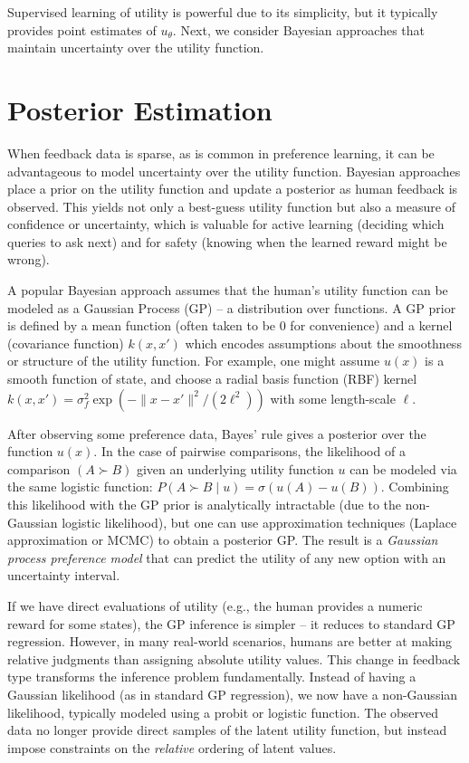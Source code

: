 \documentclass[
  letterpaper,
  numbers=noenddot,
  DIV=11]{scrreprt}
\theoremstyle{plain}
\theoremstyle{definition}
\theoremstyle{remark}
\begin{document}
Supervised learning of utility is powerful due to its simplicity, but it
typically provides point estimates of \(u_\theta\). Next, we consider
Bayesian approaches that maintain uncertainty over the utility function.

\section{Posterior Estimation}\label{posterior-estimation}

When feedback data is sparse, as is common in preference learning, it
can be advantageous to model uncertainty over the utility function.
Bayesian approaches place a prior on the utility function and update a
posterior as human feedback is observed. This yields not only a
best-guess utility function but also a measure of confidence or
uncertainty, which is valuable for active learning (deciding which
queries to ask next) and for safety (knowing when the learned reward
might be wrong).

A popular Bayesian approach assumes that the human's utility function
can be modeled as a Gaussian Process (GP) -- a distribution over
functions. A GP prior is defined by a mean function (often taken to be 0
for convenience) and a kernel (covariance function) \(k(x,x')\) which
encodes assumptions about the smoothness or structure of the utility
function. For example, one might assume \(u(x)\) is a smooth function of
state, and choose a radial basis function (RBF) kernel
\(k(x,x') = \sigma_f^2 \exp(-\|x-x'\|^2/(2\ell^2))\) with some
length-scale \(\ell\).

After observing some preference data, Bayes' rule gives a posterior over
the function \(u(x)\). In the case of pairwise comparisons, the
likelihood of a comparison \((A \succ B)\) given an underlying utility
function \(u\) can be modeled via the same logistic function:
\(P(A \succ B \mid u) = \sigma(u(A)-u(B))\). Combining this likelihood
with the GP prior is analytically intractable (due to the non-Gaussian
logistic likelihood), but one can use approximation techniques (Laplace
approximation or MCMC) to obtain a posterior GP. The result is a
\emph{Gaussian process preference model} that can predict the utility of
any new option with an uncertainty interval.

If we have direct evaluations of utility (e.g., the human provides a
numeric reward for some states), the GP inference is simpler -- it
reduces to standard GP regression. However, in many real-world
scenarios, humans are better at making relative judgments than assigning
absolute utility values. This change in feedback type transforms the
inference problem fundamentally. Instead of having a Gaussian likelihood
(as in standard GP regression), we now have a non-Gaussian likelihood,
typically modeled using a probit or logistic function. The observed data
no longer provide direct samples of the latent utility function, but
instead impose constraints on the \emph{relative} ordering of latent
values.
\end{document}
